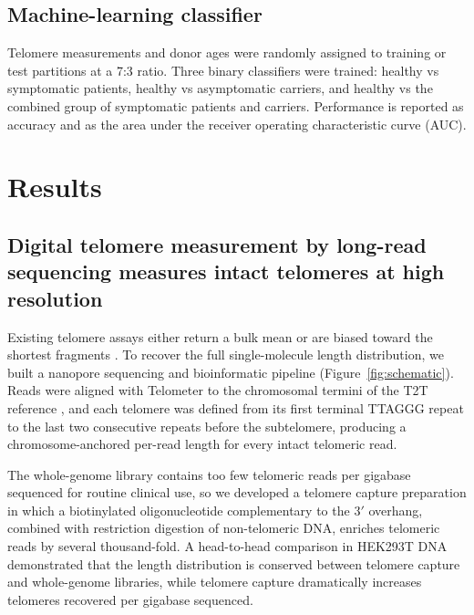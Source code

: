 \documentclass[11pt]{article}
\begin{document}
\subsection{Machine-learning classifier}

Telomere measurements and donor ages were randomly assigned to training
or test partitions at a 7:3 ratio. Three binary classifiers were trained:
healthy vs symptomatic patients, healthy vs asymptomatic carriers, and
healthy vs the combined group of symptomatic patients and carriers.
Performance is reported as accuracy and as the area under the receiver
operating characteristic curve (AUC).

\section{Results}

\subsection{Digital telomere measurement by long-read sequencing measures intact telomeres at high resolution}

Existing telomere assays either return a bulk mean or are biased toward
the shortest fragments \citep{aubert2012telomere,baird2003extensive,lai2018comparison}.
To recover the full single-molecule length distribution, we built a
nanopore sequencing and bioinformatic pipeline (Figure~\ref{fig:schematic}).
Reads were aligned with Telometer to the chromosomal termini of the T2T
reference \citep{nurk2022complete}, and each telomere was defined from
its first terminal TTAGGG repeat to the last two consecutive repeats
before the subtelomere, producing a chromosome-anchored per-read length
for every intact telomeric read.

The whole-genome library contains too few telomeric reads per gigabase
sequenced for routine clinical use, so we developed a telomere capture
preparation in which a biotinylated oligonucleotide complementary to the
3$'$ overhang, combined with restriction digestion of non-telomeric DNA,
enriches telomeric reads by several thousand-fold. A head-to-head
comparison in HEK293T DNA demonstrated that the length distribution is
conserved between telomere capture and whole-genome libraries, while
telomere capture dramatically increases telomeres recovered per gigabase
sequenced.
\end{document}
